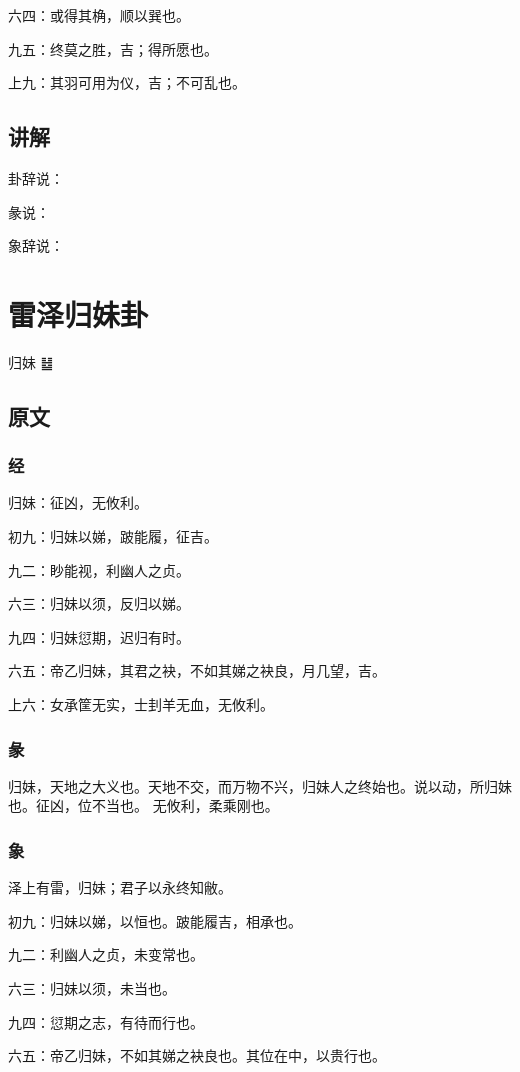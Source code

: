 \documentclass[12pt,oneside]{book}
\begin{document}
六四：或得其桷，顺以巽也。

九五：终莫之胜，吉；得所愿也。

上九：其羽可用为仪，吉；不可乱也。


\section{讲解}
卦辞说：

彖说：

象辞说：

\chapter{雷泽归妹卦}
归妹 {\Large ䷵}


\section{原文}

\subsection{经}
归妹：征凶，无攸利。

初九：归妹以娣，跛能履，征吉。

九二：眇能视，利幽人之贞。

六三：归妹以须，反归以娣。

九四：归妹愆期，迟归有时。

六五：帝乙归妹，其君之袂，不如其娣之袂良，月几望，吉。

上六：女承筐无实，士刲羊无血，无攸利。

\subsection{彖}
归妹，天地之大义也。天地不交，而万物不兴，归妹人之终始也。说以动，所归妹也。征凶，位不当也。 无攸利，柔乘刚也。

\subsection{象}
泽上有雷，归妹；君子以永终知敝。

初九：归妹以娣，以恒也。跛能履吉，相承也。

九二：利幽人之贞，未变常也。

六三：归妹以须，未当也。

九四：愆期之志，有待而行也。

六五：帝乙归妹，不如其娣之袂良也。其位在中，以贵行也。
\end{document}
